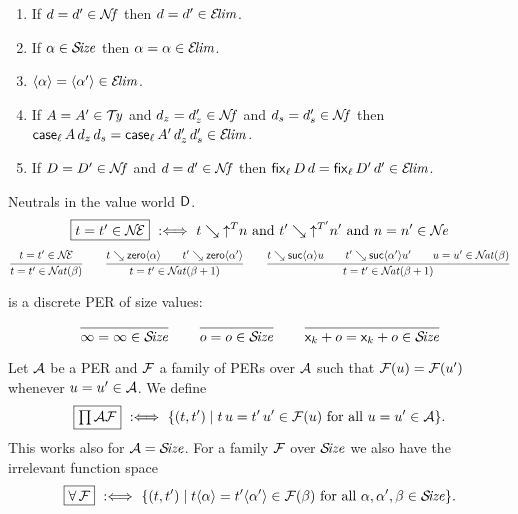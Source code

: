 \documentclass[acmlarge,review,anonymous]{acmart}\settopmatter{printfolios=true}
\begin{document}
\begin{lemma}
  \label{lem:closelim}
  \bla
  \begin{enumerate}
  \item If $d = d' \in \NF$ then $d = d' \in \ELIM$.
  \item If $\alpha \in \SIZE$ then $\alpha = \alpha \in \ELIM$.
  \item $\ann \alpha = \ann{\alpha'} \in \ELIM$.
  \item If $A = A' \in \TY$ and $d_z = d_z' \in \NF$ and $d_s = d_s' \in \NF$
        then $\case[\ell] A {d_z}{d_s} = \case[\ell]{A'}{d_z'}{d_s'} \in \ELIM$.
  \item If $D = D' \in \NF$ and $d = d' \in \NF$ then $\fix[\ell] D d = \fix[\ell]{D'}{d'} \in \ELIM$.
  \end{enumerate}
\end{lemma}

Neutrals in the value world $\D$.
\[
\fbox{$t = t' \in \NEE$} \defas
  t \evalsto \up T n \mand t' \evalsto \up{T'}{n'} \mand
  n = n' \in \NE
\]
\fbox{$\NAT(\alpha)$}
\begin{gather*}
  \ru{%
      t = t' \in \NEE
    }{t = t' \in \NAT(\beta)}
\qquad
  \ru{t \evalsto \zero \alpha \qquad
      t' \evalsto \zero{\alpha'}
    }{t = t' \in \NAT(\beta+1)}
\qquad
  \ru{t \evalsto \suc \alpha u \qquad
      t' \evalsto \suc {\alpha'} {u'} \qquad
      u = u' \in \NAT(\beta)
    }{t = t' \in \NAT(\beta+1)}
\end{gather*}

\fbox{$\SIZE$} is a discrete PER of size values:
\begin{gather*}
  \ru{
    }{\infty = \infty \in \SIZE}
\qquad
  \ru{
    }{o = o \in \SIZE}
\qquad
  \ru{
    }{\lev k + o = \lev k + o \in \SIZE}
\end{gather*}

Let $\A$ be a PER and $\F$ a family of PERs over $\A$ such that
$\F(u) = \F(u')$ whenever $u = u' \in \A$.  We define
\[
  \fbox{$\PIAF$} \defas \{(t,t') \mid t\,u = t'\,u' \in \F(u) \mforall u = u' \in \A \}
  .
\]
This works also for $\A = \SIZE$.
For a family $\F$ over $\SIZE$ we also have the irrelevant function space
\[
  \fbox{$\FORALL\,\F$} \defas
  \{(t,t') \mid t \ann \alpha = t' \ann{\alpha'} \in \F(\beta) \mforall \alpha,\alpha',\beta \in \SIZE \}
  .
\]
\end{document}
